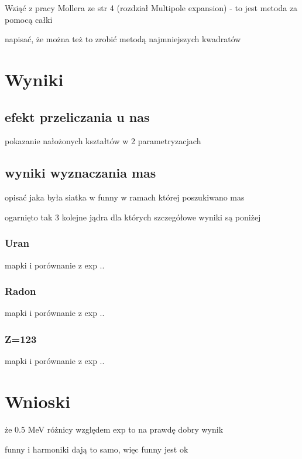 \documentclass[polish]{article}
\numberwithin{equation}{section}
\begin{document}
Wziąć z pracy Mollera ze str 4 (rozdział Multipole expansion) - to jest metoda za pomocą całki

napisać, że można też to zrobić metodą najmniejszych kwadratów

\section{Wyniki}

\subsection{efekt przeliczania u nas}

pokazanie nałożonych kształtów w 2 parametryzacjach

\subsection{wyniki wyznaczania mas}

opisać jaka była siatka w funny w ramach której poszukiwano mas

ogarnięto tak 3 kolejne jądra dla których szczegółowe wyniki są poniżej

\subsubsection{Uran}
mapki i porównanie z exp .. 

\subsubsection{Radon}
mapki i porównanie z exp .. 

\subsubsection{Z=123}
mapki i porównanie z exp .. 


\section{Wnioski}

że 0.5 MeV różnicy względem exp to na prawdę dobry wynik

funny i harmoniki dają to samo, więc funny jest ok
\end{document}
